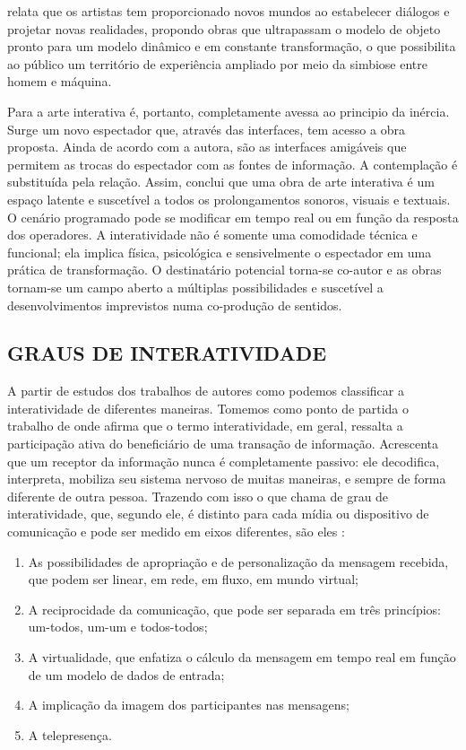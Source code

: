  relata que os artistas tem proporcionado novos mundos ao estabelecer diálogos e projetar novas realidades, propondo obras que ultrapassam o modelo de objeto pronto para um modelo dinâmico e em constante transformação, o que possibilita ao público um território de experiência ampliado por meio da simbiose entre homem e máquina.

Para  a arte interativa é, portanto, completamente avessa ao principio da inércia. Surge um novo espectador que, através das interfaces, tem acesso a obra proposta. Ainda de acordo com a autora, são as interfaces amigáveis que permitem as trocas do espectador com as fontes de informação. A contemplação é substituída pela relação. Assim,  conclui que uma obra de arte interativa é um espaço latente e suscetível a todos os prolongamentos sonoros, visuais e textuais. O cenário programado pode se modificar em tempo real ou em função da resposta dos operadores. A interatividade não é somente uma comodidade técnica e funcional; ela implica física, psicológica e sensivelmente o espectador em uma prática de transformação. O destinatário potencial torna-se co-autor e as obras tornam-se um campo aberto a múltiplas possibilidades e suscetível a desenvolvimentos imprevistos numa co-produção de sentidos.


\subsection{GRAUS DE INTERATIVIDADE}

A partir de estudos dos trabalhos de autores como  podemos classificar a interatividade de diferentes maneiras. Tomemos como ponto de partida o trabalho de  onde afirma que o termo interatividade, em geral, ressalta a participação ativa do beneficiário de uma transação de informação. Acrescenta que um receptor da informação nunca é completamente passivo: ele decodifica, interpreta, mobiliza seu sistema nervoso de muitas maneiras, e sempre de forma diferente de outra pessoa. Trazendo com isso o que chama de grau de interatividade, que, segundo ele, é distinto para cada mídia ou dispositivo de comunicação e pode ser medido em eixos diferentes, são eles  \cite[p. 82]{levy}:

\begin{enumerate}
  \item As possibilidades de apropriação e de personalização da mensagem recebida, que podem ser linear, em rede, em fluxo, em mundo virtual;
  \item A reciprocidade da comunicação, que pode ser separada em três princípios: um-todos, um-um e todos-todos;
  \item A virtualidade, que enfatiza o cálculo da mensagem em tempo real em função de um modelo de dados de entrada;
  \item A implicação da imagem dos participantes nas mensagens;
  \item A telepresença. 
\end{enumerate}

